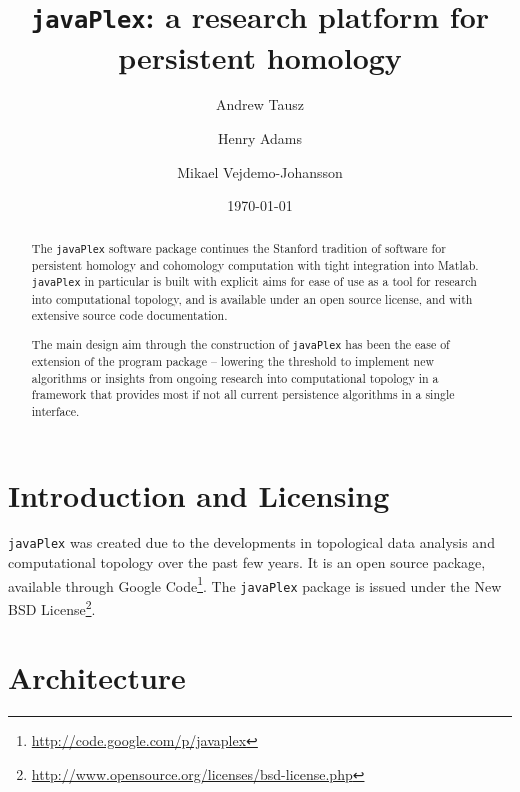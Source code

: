 \documentclass[11pt]{amsart}
\newcommand\javaPlex{\texttt{javaPlex}\xspace}
\begin{document}
\title{\javaPlex: a research platform for persistent homology }

\author{Andrew Tausz}
\address{Stanford University, Stanford, CA, 94305}

\author{Henry Adams}
\address{Stanford University, Stanford, CA, 94305}

\author{Mikael Vejdemo-Johansson}
\address{School of Computer Science; University of St Andrews; Scotland}

\date{\today}

\begin{abstract}
  The \javaPlex software package continues the Stanford tradition of software for persistent homology and cohomology computation with tight integration into Matlab. \javaPlex in particular is built with explicit aims for ease of use as a tool for research into computational topology, and is available under an open source license, and with extensive source code documentation.

  The main design aim through the construction of \javaPlex has been the ease of extension of the program package -- lowering the threshold to implement new algorithms or insights from ongoing research into computational topology in a framework that provides most if not all current persistence algorithms in a single interface.
\end{abstract}

\maketitle

\section{Introduction and Licensing}

\javaPlex was created due to the developments in topological data analysis and computational topology over the past few years. It is an open source package, available through Google Code\footnote{\url{http://code.google.com/p/javaplex}}. The \javaPlex package is issued under the New BSD License\footnote{\url{http://www.opensource.org/licenses/bsd-license.php}}. 

\section{Architecture}
\end{document}
